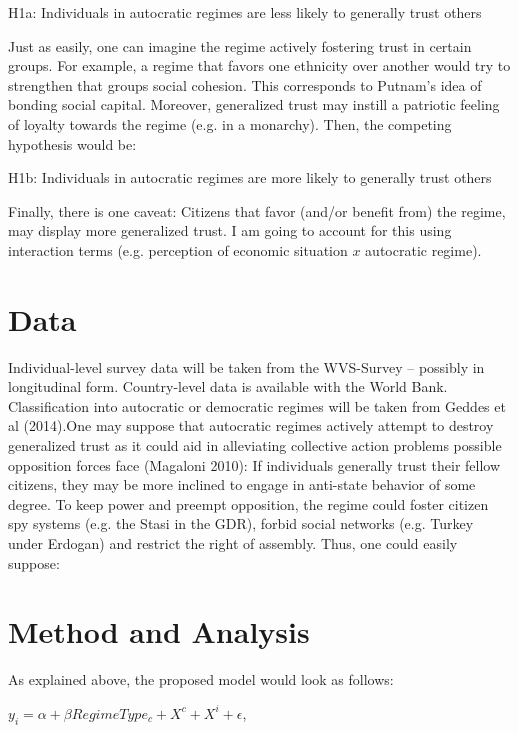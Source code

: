 \begin{center}
H1a: Individuals in autocratic regimes are less likely to generally trust others
\end{center}

Just as easily, one can imagine the regime actively fostering trust in certain groups. For example, a regime that favors one ethnicity over another would try to strengthen that groups social cohesion. This corresponds to Putnam's idea of bonding social capital. Moreover, generalized trust may instill a patriotic feeling of loyalty towards the regime (e.g. in a monarchy). Then, the competing hypothesis would be:

\begin{center}
H1b: Individuals in autocratic regimes are more likely to generally trust others
\end{center}

Finally, there is one caveat: Citizens that favor (and/or benefit from) the regime, may display more generalized trust. I am going to account for this using interaction terms (e.g. perception of economic situation $x$ autocratic regime).

\section{Data}
Individual-level survey data will be taken from the WVS-Survey – possibly in longitudinal form. Country-level data is available with the World Bank. Classification into autocratic or democratic regimes will be taken from Geddes et al (2014)\nocite{geddes2014autocratic}.One may suppose that autocratic regimes actively attempt to destroy generalized trust as it could aid in alleviating collective action problems possible opposition forces face (Magaloni 2010)\nocite{magaloni2010game}: If individuals generally trust their fellow citizens, they may be more inclined to engage in anti-state behavior of some degree. To keep power and preempt opposition, the regime could foster citizen spy systems (e.g. the Stasi in the GDR), forbid social networks (e.g. Turkey under Erdogan) and restrict the right of assembly. Thus, one could easily suppose:

\section{Method and Analysis}

As explained above, the proposed model would look as follows:

\begin{center}

$y_i=\alpha+\beta RegimeType_c + X^c + X^i + \epsilon$,

\end{center}

